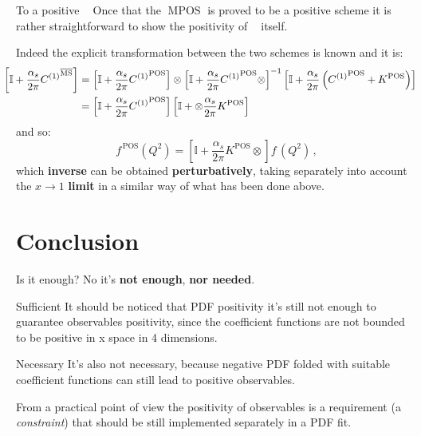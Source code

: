 \documentclass[9pt]{beamer}
\DeclareMathOperator{\msbar}{\overline{MS}}
\DeclareMathOperator{\pos}{POS}
\DeclareMathOperator{\mpos}{MPOS}
\begin{document}
\begin{frame}{To a positive $\msbar$}
    Once that the $\mpos$ is proved to be a positive scheme it is rather
    straightforward to show the positivity of $\msbar$ itself.

    Indeed the explicit transformation between the two schemes is known and it
    is:
    \begin{align*}
        \hspace*{-12pt}\left[\mathbb{I}
        +\frac{\alpha_s}{2\pi} {C^{(1)}}^{\msbar}\right]&=\left[\mathbb{I}
          +\frac{\alpha_s}{2\pi} {C^{(1)}}^{\pos}\right]\otimes\left[\mathbb{I}
          +\frac{\alpha_s}{2\pi} {C^{(1)}}^{\pos}\otimes\right]^{-1}\left[\mathbb{I}
          +\frac{\alpha_s}{2\pi}  \left({C^{(1)}}^{\pos} +K^{\pos}\right)\right]\\  
        &=\left[\mathbb{I}
          +\frac{\alpha_s}{2\pi} {C^{(1)}}^{\pos}
          \right]\left[\mathbb{I}
          + \otimes \frac{\alpha_s}{2\pi}  K^{\pos}\right]
    \end{align*}
    and so:
    \begin{equation*}
     f^{\,\pos}(Q^2)=\left[\mathbb{I}
      +\frac{\alpha_s}{2\pi}  K^{\pos}\otimes\right] f^{\,\msbar}(Q^2)\,,
    \end{equation*}
    which \textbf{inverse} can be obtained \textbf{perturbatively}, taking
    separately into account the $x \to 1$ \textbf{limit} in a similar way of
    what has been done above.
\end{frame}

\section{Conclusion}
\begin{frame}{Is it enough?}
    No it's \textbf{not enough}, \textbf{nor needed}.

    \begin{block}{Sufficient}
    It should be noticed that PDF positivity it's still not enough to guarantee
    observables positivity, since the coefficient functions are not bounded to
    be positive in x space in 4 dimensions.
    \end{block}

    \begin{block}{Necessary}
    It's also not necessary, because negative PDF folded with suitable
    coefficient functions can still lead to positive observables.
    \end{block}

    From a practical point of view the positivity of observables is a
    requirement (a \textit{constraint}) that should be still implemented
    separately in a PDF fit.
\end{frame}
\end{document}
